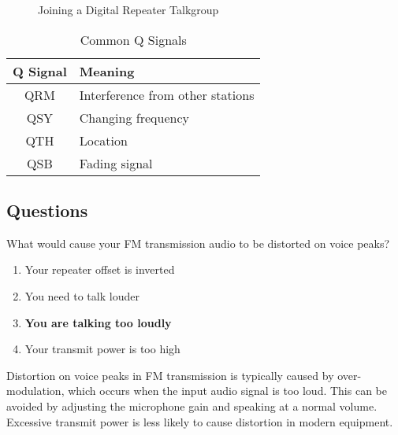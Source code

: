 \begin{figure}[h]
    \centering
    \caption{Joining a Digital Repeater Talkgroup}
    \label{fig:talkgroup}
\end{figure}

\begin{table}[h]
    \centering
    \begin{tabular}{|c|l|}
        \hline
        \textbf{Q Signal} & \textbf{Meaning} \\
        \hline
        QRM & Interference from other stations \\
        QSY & Changing frequency \\
        QTH & Location \\
        QSB & Fading signal \\
        \hline
    \end{tabular}
    \caption{Common Q Signals}
    \label{tab:q_signals}
\end{table}

\subsection*{Questions}
\begin{tcolorbox}[colback=gray!10!white,colframe=black!75!black,title={T2B05}]
    What would cause your FM transmission audio to be distorted on voice peaks?
    \begin{enumerate}[label=\Alph*),noitemsep]
        \item Your repeater offset is inverted
        \item You need to talk louder
        \item \textbf{You are talking too loudly}
        \item Your transmit power is too high
    \end{enumerate}
\end{tcolorbox}
Distortion on voice peaks in FM transmission is typically caused by over-modulation, which occurs when the input audio signal is too loud. This can be avoided by adjusting the microphone gain and speaking at a normal volume. Excessive transmit power is less likely to cause distortion in modern equipment.



